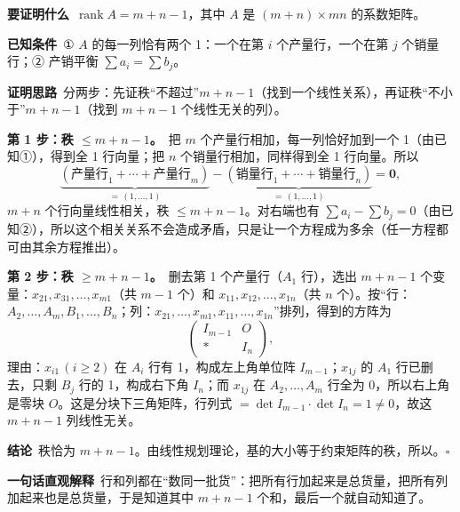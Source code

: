 \begin{proofbox}[秩 $=m+n-1$]
\textbf{要证明什么}\ $\operatorname{rank}A=m+n-1$，其中 $A$ 是 $(m+n)\times mn$ 的系数矩阵。\par
\textbf{已知条件}\ ① $A$ 的每一列恰有两个 1：一个在第 $i$ 个产量行，一个在第 $j$ 个销量行；② 产销平衡 $\sum a_i=\sum b_j$。\par
\textbf{证明思路}\ 分两步：先证秩“不超过”$m+n-1$（找到一个线性关系），再证秩“不小于”$m+n-1$（找到 $m+n-1$ 个线性无关的列）。\par
\textbf{第 1 步：秩 $\le m+n-1$。}\ 把 $m$ 个产量行相加，每一列恰好加到一个 1（由已知①），得到全 1 行向量；把 $n$ 个销量行相加，同样得到全 1 行向量。所以
\[\underbrace{(\text{产量行}_1+\cdots+\text{产量行}_m)}_{=\,(1,\dots,1)}-\underbrace{(\text{销量行}_1+\cdots+\text{销量行}_n)}_{=\,(1,\dots,1)}=\mathbf 0,\]
$m+n$ 个行向量线性相关，秩 $\le m+n-1$。对右端也有 $\sum a_i-\sum b_j=0$（由已知②），所以这个相关关系不会造成矛盾，只是让一个方程成为多余（任一方程都可由其余方程推出）。\par
\textbf{第 2 步：秩 $\ge m+n-1$。}\ 删去第 1 个产量行（$A_1$ 行），选出 $m+n-1$ 个变量：$x_{21},x_{31},\dots,x_{m1}$（共 $m-1$ 个）和 $x_{11},x_{12},\dots,x_{1n}$（共 $n$ 个）。按“行：$A_2,\dots,A_m,B_1,\dots,B_n$；列：$x_{21},\dots,x_{m1},x_{11},\dots,x_{1n}$”排列，得到的方阵为
\[
\begin{pmatrix} I_{m-1} & O\\ * & I_n\end{pmatrix},
\]
理由：$x_{i1}\,(i\ge2)$ 在 $A_i$ 行有 1，构成左上角单位阵 $I_{m-1}$；$x_{1j}$ 的 $A_1$ 行已删去，只剩 $B_j$ 行的 1，构成右下角 $I_n$；而 $x_{1j}$ 在 $A_2,\dots,A_m$ 行全为 0，所以右上角是零块 $O$。这是分块下三角矩阵，行列式 $=\det I_{m-1}\cdot\det I_n=1\ne0$，故这 $m+n-1$ 列线性无关。\par
\textbf{结论}\ 秩恰为 $m+n-1$。由线性规划理论，基的大小等于约束矩阵的秩，所以。\hfill$\square$\par
\textbf{一句话直观解释}\ 行和列都在“数同一批货”：把所有行加起来是总货量，把所有列加起来也是总货量，于是知道其中 $m+n-1$ 个和，最后一个就自动知道了。
\end{proofbox}

